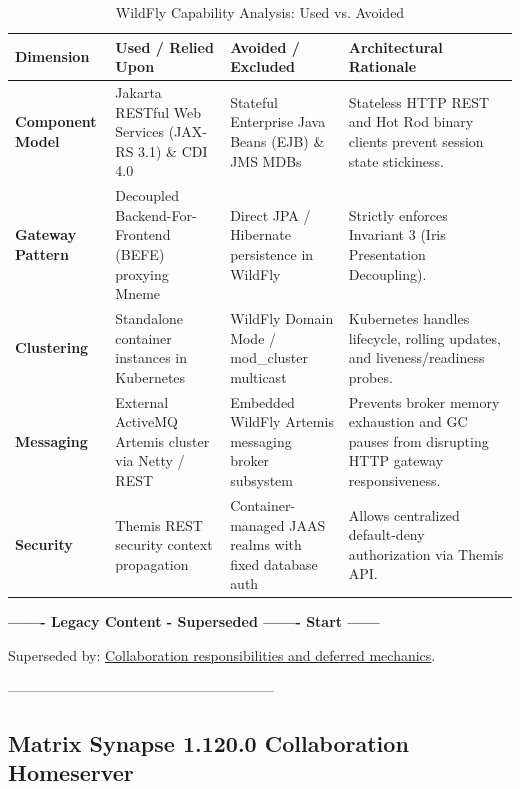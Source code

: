 \begin{table}[htbp]
\centering
\scriptsize
\begin{tabularx}{\textwidth}{P{3.0cm} P{3.8cm} P{3.8cm} Y}
\toprule
\textbf{Dimension} & \textbf{Used / Relied Upon} & \textbf{Avoided / Excluded} & \textbf{Architectural Rationale} \\
\midrule
\textbf{Component Model} & Jakarta RESTful Web Services (JAX-RS 3.1) \& CDI 4.0 & Stateful Enterprise Java Beans (EJB) \& JMS MDBs & Stateless HTTP REST and Hot Rod binary clients prevent session state stickiness. \\
\addlinespace
\textbf{Gateway Pattern} & Decoupled Backend-For-Frontend (BEFE) proxying Mneme & Direct JPA / Hibernate persistence in WildFly & Strictly enforces Invariant 3 (Iris Presentation Decoupling). \\
\addlinespace
\textbf{Clustering} & Standalone container instances in Kubernetes & WildFly Domain Mode / mod\_cluster multicast & Kubernetes handles lifecycle, rolling updates, and liveness/readiness probes. \\
\addlinespace
\textbf{Messaging} & External ActiveMQ Artemis cluster via Netty / REST & Embedded WildFly Artemis messaging broker subsystem & Prevents broker memory exhaustion and GC pauses from disrupting HTTP gateway responsiveness. \\
\addlinespace
\textbf{Security} & Themis REST security context propagation & Container-managed JAAS realms with fixed database auth & Allows centralized default-deny authorization via Themis API. \\
\bottomrule
\end{tabularx}
\caption{WildFly Capability Analysis: Used vs. Avoided}
\label{tab:wildfly_used_vs_avoided}
\end{table}


\par\noindent\textbf{------- Legacy Content - Superseded ------- Start ------}
\par\noindent Superseded by: \href{../../markdown/05-information-systems-architecture/agora-omilia-collaboration.md\#deferred-collaboration-design}{Collaboration responsibilities and deferred mechanics}.
\par\noindent ---------------------------------------------------------

\subsection{Matrix Synapse 1.120.0 Collaboration Homeserver}

